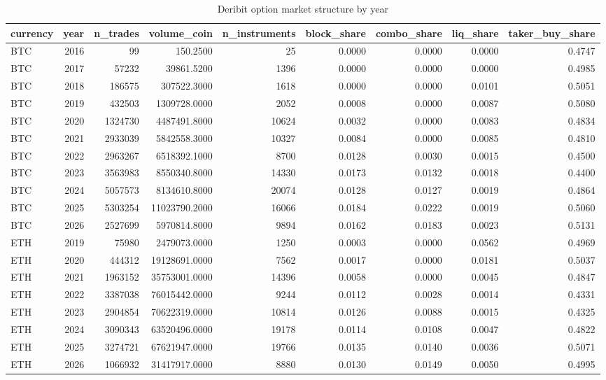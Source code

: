 \begin{table}
\caption{Deribit option market structure by year}
\label{tab:t1_market_structure}
\begin{tabular}{lrrrrrrrr}
\toprule
currency & year & n\_trades & volume\_coin & n\_instruments & block\_share & combo\_share & liq\_share & taker\_buy\_share \\
\midrule
BTC & 2016 & 99 & 150.2500 & 25 & 0.0000 & 0.0000 & 0.0000 & 0.4747 \\
BTC & 2017 & 57232 & 39861.5200 & 1396 & 0.0000 & 0.0000 & 0.0000 & 0.4985 \\
BTC & 2018 & 186575 & 307522.3000 & 1618 & 0.0000 & 0.0000 & 0.0101 & 0.5051 \\
BTC & 2019 & 432503 & 1309728.0000 & 2052 & 0.0008 & 0.0000 & 0.0087 & 0.5080 \\
BTC & 2020 & 1324730 & 4487491.8000 & 10624 & 0.0032 & 0.0000 & 0.0083 & 0.4834 \\
BTC & 2021 & 2933039 & 5842558.3000 & 10327 & 0.0084 & 0.0000 & 0.0085 & 0.4810 \\
BTC & 2022 & 2963267 & 6518392.1000 & 8700 & 0.0128 & 0.0030 & 0.0015 & 0.4500 \\
BTC & 2023 & 3563983 & 8550340.8000 & 14330 & 0.0173 & 0.0132 & 0.0018 & 0.4400 \\
BTC & 2024 & 5057573 & 8134610.8000 & 20074 & 0.0128 & 0.0127 & 0.0019 & 0.4864 \\
BTC & 2025 & 5303254 & 11023790.2000 & 16066 & 0.0184 & 0.0222 & 0.0019 & 0.5060 \\
BTC & 2026 & 2527699 & 5970814.8000 & 9894 & 0.0162 & 0.0183 & 0.0023 & 0.5131 \\
ETH & 2019 & 75980 & 2479073.0000 & 1250 & 0.0003 & 0.0000 & 0.0562 & 0.4969 \\
ETH & 2020 & 444312 & 19128691.0000 & 7562 & 0.0017 & 0.0000 & 0.0181 & 0.5037 \\
ETH & 2021 & 1963152 & 35753001.0000 & 14396 & 0.0058 & 0.0000 & 0.0045 & 0.4847 \\
ETH & 2022 & 3387038 & 76015442.0000 & 9244 & 0.0112 & 0.0028 & 0.0014 & 0.4331 \\
ETH & 2023 & 2904854 & 70622319.0000 & 10814 & 0.0126 & 0.0088 & 0.0015 & 0.4325 \\
ETH & 2024 & 3090343 & 63520496.0000 & 19178 & 0.0114 & 0.0108 & 0.0047 & 0.4822 \\
ETH & 2025 & 3274721 & 67621947.0000 & 19766 & 0.0135 & 0.0140 & 0.0036 & 0.5071 \\
ETH & 2026 & 1066932 & 31417917.0000 & 8880 & 0.0130 & 0.0149 & 0.0050 & 0.4995 \\
\bottomrule
\end{tabular}
\end{table}
